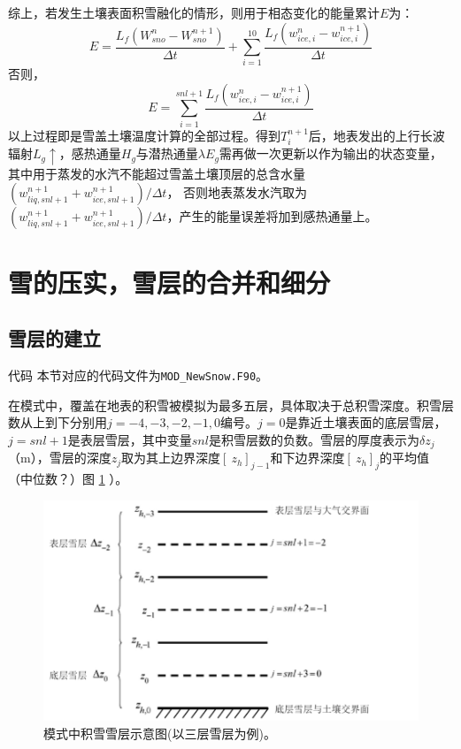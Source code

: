 综上，若发生土壤表面积雪融化的情形，则用于相态变化的能量累计$E$为：
\begin{equation}
E=\frac{L_{f}\left(W_{sno}^{n}-W_{sno}^{n+1}\right)}{\Delta t}+\sum_{i=1}^{10} \frac{L_{f}\left(w_{ice, i}^{n}-w_{ice, i}^{n+1}\right)}{\Delta t}
\end{equation}
否则，
\begin{equation}
E=\sum_{i=1}^{s n l+1} \frac{L_{f}\left(w_{ice, i}^{n}-w_{ice, i}^{n+1}\right)}{\Delta t}
\end{equation}
以上过程即是雪盖土壤温度计算的全部过程。得到$T_i^{n+1}$后，地表发出的上行长波辐射$L_g\uparrow$，感热通量$H_g$与潜热通量$\lambda E_g$需再做一次更新以作为输出的状态变量，
其中用于蒸发的水汽不能超过雪盖土壤顶层的总含水量$\left(w_{liq,snl+1}^{n+1}+w_{ice,snl+1}^{n+1}\right)/\Delta t$，
否则地表蒸发水汽取为$\left(w_{liq,snl+1}^{n+1}+w_{ice,snl+1}^{n+1}\right)/\Delta t$，产生的能量误差将加到感热通量上。

\section{雪的压实，雪层的合并和细分}
\subsection{雪层的建立}
\begin{mymdframed}{代码}
本节对应的代码文件为\texttt{MOD\_NewSnow.F90}。
\end{mymdframed}
在模式中，覆盖在地表的积雪被模拟为最多五层，具体取决于总积雪深度。积雪层数从上到下分别用$j = −4, −3, −2, −1, 0$编号。$j = 0$是靠近土壤表面的底层雪层，$j = snl + 1$是表层雪层，其中变量$snl$是积雪层数的负数。雪层的厚度表示为$\delta z_j$（m），雪层的深度$z_j$取为其上边界深度$\left[{\ z}_h\right]_{j-1}$和下边界深度$\left[{\ z}_h\right]_j$的平均值（中位数？）图 \ref{fig:模式中积雪雪层示意图}
）。
{
\begin{figure}[]
\centering
\includegraphics{Figures/雪盖土壤热力过程/模式中积雪雪层示意图.png}
\caption{模式中积雪雪层示意图(以三层雪层为例)。}
\label{fig:模式中积雪雪层示意图}
\end{figure}
}

